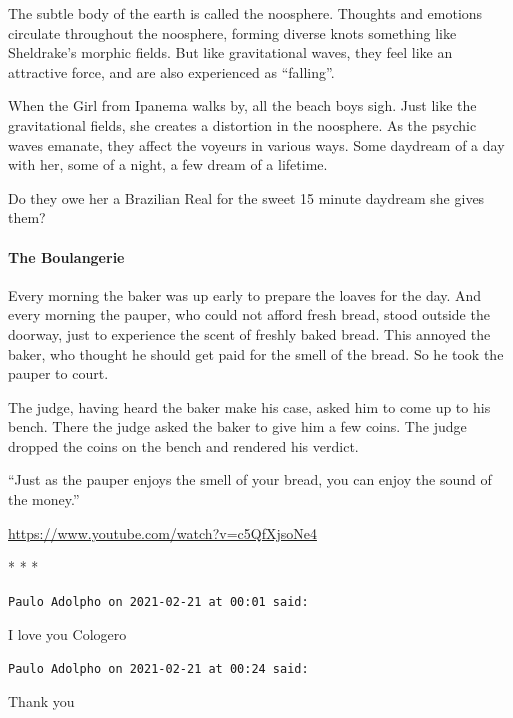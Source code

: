The subtle body of the earth is called the noosphere. Thoughts and emotions circulate throughout the noosphere, forming diverse knots something like Sheldrake's morphic fields. But like gravitational waves, they feel like an attractive force, and are also experienced as ``falling''.

When the Girl from Ipanema walks by, all the beach boys sigh. Just like the gravitational fields, she creates a distortion in the noosphere. As the psychic waves emanate, they affect the voyeurs in various ways. Some daydream of a day with her, some of a night, a few dream of a lifetime.

Do they owe her a Brazilian Real for the sweet 15 minute daydream she gives them?

\paragraph{The Boulangerie}


Every morning the baker was up early to prepare the loaves for the day. And every morning the pauper, who could not afford fresh bread, stood outside the doorway, just to experience the scent of freshly baked bread. This annoyed the baker, who thought he should get paid for the smell of the bread. So he took the pauper to court.

The judge, having heard the baker make his case, asked him to come up to his bench. There the judge asked the baker to give him a few coins. The judge dropped the coins on the bench and rendered his verdict.

``Just as the pauper enjoys the smell of your bread, you can enjoy the sound of the money.''

\url{https://www.youtube.com/watch?v=c5QfXjsoNe4}


\begin{center}* * *\end{center}

\begin{footnotesize}
\begin{sffamily}
\texttt{Paulo Adolpho on 2021-02-21 at 00:01 said:}

I love you Cologero

\hfill

\texttt{Paulo Adolpho on 2021-02-21 at 00:24 said:}

Thank you

\end{sffamily}
\end{footnotesize}

